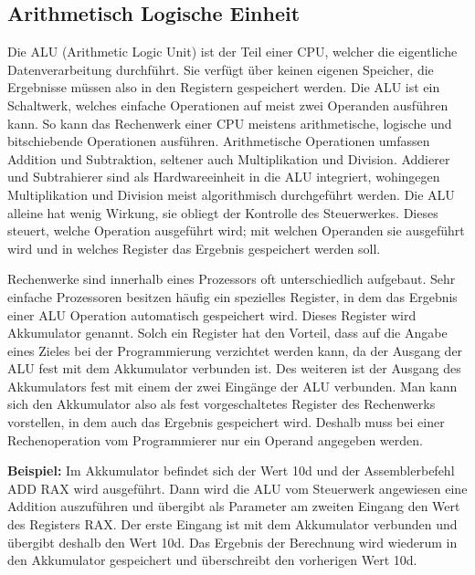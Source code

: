 \documentclass[12pt]{article}
\begin{document}
\subsection{Arithmetisch Logische Einheit} \label{subsec:alu}
Die ALU (Arithmetic Logic Unit) ist der Teil einer CPU, welcher die eigentliche Datenverarbeitung durchführt. Sie verfügt über keinen eigenen Speicher, die Ergebnisse müssen also in den Registern gespeichert werden. Die ALU ist ein Schaltwerk, welches einfache Operationen auf meist zwei Operanden ausführen kann. So kann das Rechenwerk einer CPU meistens arithmetische, logische und bitschiebende Operationen ausführen. Arithmetische Operationen umfassen Addition und Subtraktion, seltener auch Multiplikation und Division. Addierer und Subtrahierer sind als Hardwareeinheit in die ALU integriert, wohingegen Multiplikation und Division meist algorithmisch durchgeführt werden. Die ALU alleine hat wenig Wirkung, sie obliegt der Kontrolle des Steuerwerkes. Dieses steuert, welche Operation ausgeführt wird; mit welchen Operanden sie ausgeführt wird und in welches Register das Ergebnis gespeichert werden soll.

\par \bigskip
\noindent Rechenwerke sind innerhalb eines Prozessors oft unterschiedlich aufgebaut. 
Sehr einfache Prozessoren besitzen häufig ein spezielles Register, in dem das Ergebnis einer ALU Operation automatisch gespeichert wird. Dieses Register wird Akkumulator genannt. Solch ein Register hat den Vorteil, dass auf die Angabe eines Zieles bei der Programmierung verzichtet werden kann, da der Ausgang der ALU fest mit dem Akkumulator verbunden ist. Des weiteren ist der Ausgang des Akkumulators fest mit einem der zwei Eingänge der ALU verbunden. Man kann sich den Akkumulator also als fest vorgeschaltetes Register des Rechenwerks vorstellen, in dem auch das Ergebnis gespeichert wird. Deshalb muss bei einer Rechenoperation vom Programmierer nur ein Operand angegeben werden. 

\par\bigskip\noindent \textbf{Beispiel:} Im Akkumulator befindet sich der Wert 10d  und der Assemblerbefehl ADD RAX wird ausgeführt. Dann wird die ALU vom Steuerwerk angewiesen eine Addition auszuführen und übergibt als Parameter am zweiten Eingang den Wert des Registers RAX. Der erste Eingang ist mit dem Akkumulator verbunden und übergibt deshalb den Wert 10d. Das Ergebnis der Berechnung wird wiederum in den Akkumulator gespeichert und überschreibt den vorherigen Wert 10d.  
\end{document}
